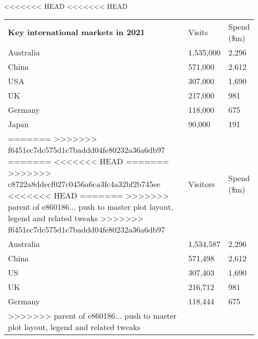 <<<<<<< HEAD
<<<<<<< HEAD
\begin{tabular}[t]{p{4.7cm}>{\hfill}p{1.1cm}>{\hfill}p{1.7cm}}
 \textbf{Key international markets in 2021} & Visits & Spend (\$m) \\ 
 Australia & 1,535,000 & 2,296 \\ 
  China &   571,000 & 2,612 \\ 
  USA &   307,000 & 1,690 \\ 
  UK &   217,000 & 981 \\ 
  Germany &   118,000 & 675 \\ 
  Japan &    90,000 & 191 \\ 
=======
>>>>>>> f6451ec7dc575d1c7baddd04fe80232a36a6db97
=======
<<<<<<< HEAD
=======
>>>>>>> c8722a8ddecf027c0456a6ca3fc4a32bf2b745ee
<<<<<<< HEAD
=======
>>>>>>> parent of e860186... push to master plot layout, legend and related tweaks
>>>>>>> f6451ec7dc575d1c7baddd04fe80232a36a6db97
\begin{tabular}[t]{p{5.1cm}>{\hfill}p{1.1cm}>{\hfill}p{1.3cm}}
 Key overseas markets & Visitors & Spend (\$m) \\ 
 Australia & 1,534,587 & 2,296 \\ 
  China &   571,498 & 2,612 \\ 
  US &   307,403 & 1,690 \\ 
  UK &   216,712 & 981 \\ 
  Germany &   118,444 & 675 \\ 
>>>>>>> parent of e860186... push to master plot layout, legend and related tweaks
  \end{tabular}
